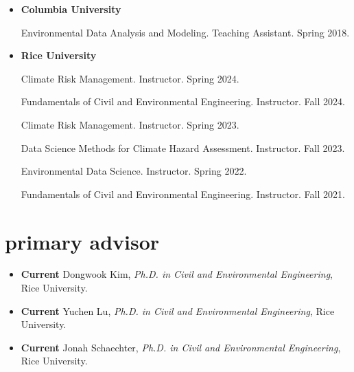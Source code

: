 \documentclass[10pt,oneside]{article}
\begin{document}
\begin{itemize}[label={}]
  
  \item \textbf{Columbia University}
        
        Environmental Data Analysis and Modeling. Teaching Assistant. Spring 2018.
        
        
  \item \textbf{Rice University}
        
        Climate Risk Management. Instructor. Spring 2024.
        
        Fundamentals of Civil and Environmental Engineering. Instructor. Fall 2024.
        
        Climate Risk Management. Instructor. Spring 2023.
        
        Data Science Methods for Climate Hazard Assessment. Instructor. Fall 2023.
        
        Environmental Data Science. Instructor. Spring 2022.
        
        Fundamentals of Civil and Environmental Engineering. Instructor. Fall 2021.
        
        
\end{itemize}


\section{primary advisor}

\mbox{}\vspace{-\dimexpr\baselineskip\relax}

\begin{itemize}[label={}]

  
    \item \textbf{Current} Dongwook Kim, \textit{Ph.D. in Civil and Environmental Engineering}, Rice University. 
  
    \item \textbf{Current} Yuchen Lu, \textit{Ph.D. in Civil and Environmental Engineering}, Rice University. 
  
    \item \textbf{Current} Jonah Schaechter, \textit{Ph.D. in Civil and Environmental Engineering}, Rice University. 
  
  
  
\end{itemize}

\end{document}
